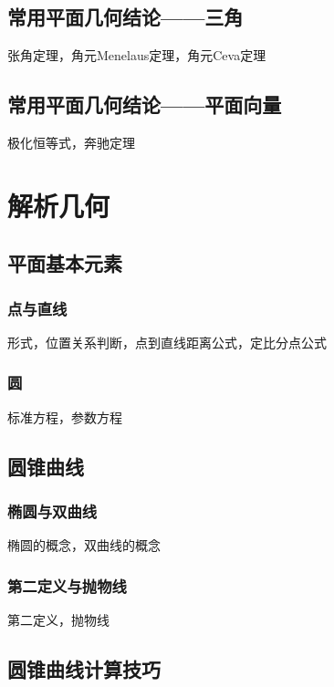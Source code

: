 \documentclass[lang=cn, zihao=4.5]{elegantbook}
\begin{document}
\section{常用平面几何结论——三角}

张角定理，角元Menelaus定理，角元Ceva定理

\section{常用平面几何结论——平面向量}

极化恒等式，奔驰定理

\chapter{解析几何}

\section{平面基本元素}

\subsection{点与直线}

形式，位置关系判断，点到直线距离公式，定比分点公式

\subsection{圆}

标准方程，参数方程

\section{圆锥曲线}

\subsection{椭圆与双曲线}

椭圆的概念，双曲线的概念

\subsection{第二定义与抛物线}

第二定义，抛物线

\section{圆锥曲线计算技巧}
\end{document}
